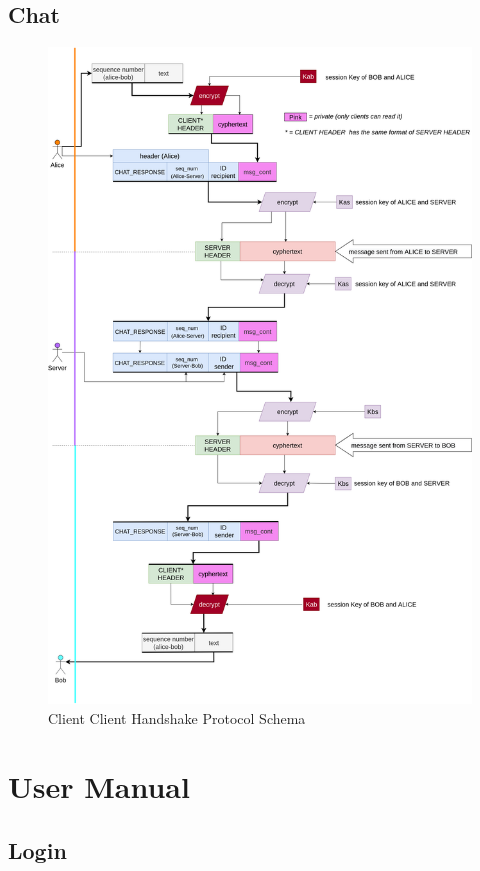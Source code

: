 \documentclass[11pt]{report}
\begin{document}
\section{Chat}
\begin{figure}[H]
	\centering
	\includegraphics[scale=0.15]{img/message_relay.png}
	\caption{Client Client Handshake Protocol Schema}
	\label {img: MessageRelay}
\end{figure}


\chapter{User Manual}
\section{Login}
\end{document}
